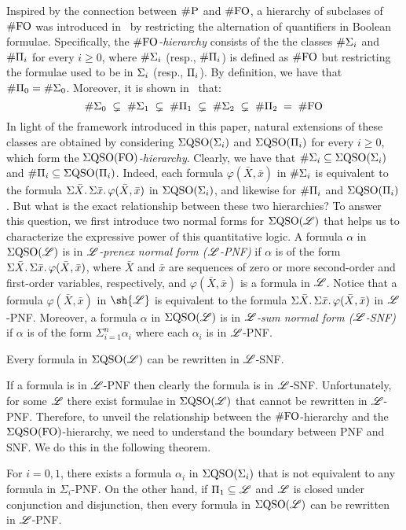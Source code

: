 
Inspired by the connection between $\text{\sc \#P}$ and $\#{\rm FO}$, a hierarchy of subclases of $\#{\rm FO}$ was introduced in~\cite{SalujaST95} 
by restricting the alternation of quantifiers in Boolean formulae.
Specifically, the \emph{$\#{\rm FO}$-hierarchy} consists of the 
the classes $\#\Sigma_{i}$ and $\#\Pi_{i}$ for every $i \geq 0$, where $\#\Sigma_{i}$ (resp., $\#\Pi_{i}$) is defined as $\#{\rm FO}$ but restricting the formulae used to be in $\Sigma_{i}$ (resp., $\Pi_{i}$).
By definition, we have that $\#\Pi_{0} = \#\Sigma_{0}$. Moreover, it is shown in~\cite{SalujaST95} that:
\[
\#\Sigma_{0} \; \subsetneq \; \#\Sigma_{1} \; \subsetneq \; \#\Pi_{1} \; \subsetneq \; \#\Sigma_{2} \; \subsetneq \; \#\Pi_{2} \; = \; \#{\rm FO} 
\]
In light of the framework introduced in this paper, natural extensions of these classes are obtained by considering 
$\Sigma{\rm QSO}(\Sigma_{i})$ and $\Sigma{\rm QSO}(\Pi_{i})$ for every $i \geq 0$, which form the \emph{$\Sigma{\rm QSO}({\rm FO})$-hierarchy}.
Clearly, we have that $\#\Sigma_{i} \subseteq \Sigma{\rm QSO}(\Sigma_{i})$ and $\#\Pi_{i} \subseteq \Sigma{\rm QSO}(\Pi_{i})$. Indeed, each formula $\varphi(\bar{X}, \bar{x})$ in $\#\Sigma_{i}$ is equivalent to the formula $\Sigma{\bar X}.\, \Sigma{\bar x}.\, \varphi(\bar{X}, \bar{x})$ in $\Sigma{\rm QSO}(\Sigma_{i})$, and likewise for $\#\Pi_{i}$ and $\Sigma{\rm QSO}(\Pi_{i})$.
But what is the exact relationship between these two hierarchies?
To answer this question, we first introduce two normal forms for $\Sigma{\rm QSO}(\mathscr{L})$ that helps us to characterize the expressive power of this quantitative logic.
A formula $\alpha$ in $\Sigma{\rm QSO}(\mathscr{L})$ is in \emph{$\mathscr{L}$-prenex normal form ($\mathscr{L}$-PNF)} 
if $\alpha$ is of the form
$\Sigma{\bar{X}}.\, \Sigma{\bar{x}}.\, \varphi(\bar{X}, \bar{x})$,
where $\bar{X}$ and $\bar{x}$ are sequences of zero or more second-order and first-order variables, respectively, and $\varphi(\bar{X}, \bar{x})$ is a formula in $\mathscr{L}$. Notice that 
a formula $\varphi(\bar{X}, \bar{x})$ in $\sh{\LL}$ is equivalent to the formula $\Sigma{\bar X}.\, \Sigma{\bar x}.\, \varphi(\bar{X}, \bar{x})$ in $\mathscr{L}$-PNF. 
Moreover, a formula $\alpha$ in $\Sigma{\rm QSO}(\mathscr{L})$ is in \emph{$\mathscr{L}$-sum normal form ($\mathscr{L}$-SNF)} if $\alpha$ is of the form $\Sigma_{i=1}^n \alpha_i$ where each $\alpha_i$ is in $\mathscr{L}$-PNF. 
\begin{proposition}\label{theo-pnf-snf}
Every formula in $\Sigma{\rm QSO}(\mathscr{L})$ can be rewritten in $\mathscr{L}$-SNF.
\end{proposition}
If a formula is in $\mathscr{L}$-PNF then clearly the formula is in $\mathscr{L}$-SNF.
Unfortunately, for some $\mathscr{L}$ there exist formulae in $\Sigma{\rm QSO}(\mathscr{L})$  that cannot be rewritten in $\mathscr{L}$-PNF.
Therefore, to unveil the relationship between the $\#{\rm FO}$-hierarchy and the $\Sigma{\rm QSO}({\rm FO})$-hierarchy, we need to understand the boundary between PNF and SNF. We do this in the following theorem. 
\begin{theorem}\label{theo-pi1-pnf}
For $i = 0,1$, there exists a formula $\alpha_i$ in $\Sigma{\rm QSO}(\Sigma_{i})$ that is not equivalent to any formula in $\Sigma_i$-PNF. 
On the other hand, if $\Pi_{1} \subseteq \mathscr{L}$ and $\mathscr{L}$ is closed under conjunction and disjunction, then 
	every formula in
	$\Sigma{\rm QSO}(\mathscr{L})$ can be rewritten in $\mathscr{L}$-PNF. 
\end{theorem}


